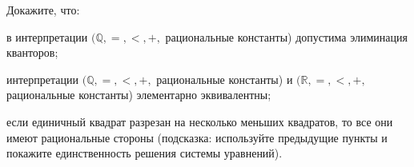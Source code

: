 Докажите, что:
\begin{enumcyr}
    \item в интерпретации $(\mathbb{Q}, =, <, +,$ рациональные константы) допустима элиминация кванторов;
    \item интерпретации $(\mathbb{Q}, =, <, +,$ рациональные константы) и $(\mathbb{R}, =, <, +,$ рациональные константы)
	    элементарно эквивалентны;
    \item если единичный квадрат разрезан на несколько меньших квадратов, то все они имеют рациональные стороны (подсказка:
	    используйте предыдущие пункты и покажите единственность решения системы уравнений).
\end{enumcyr}